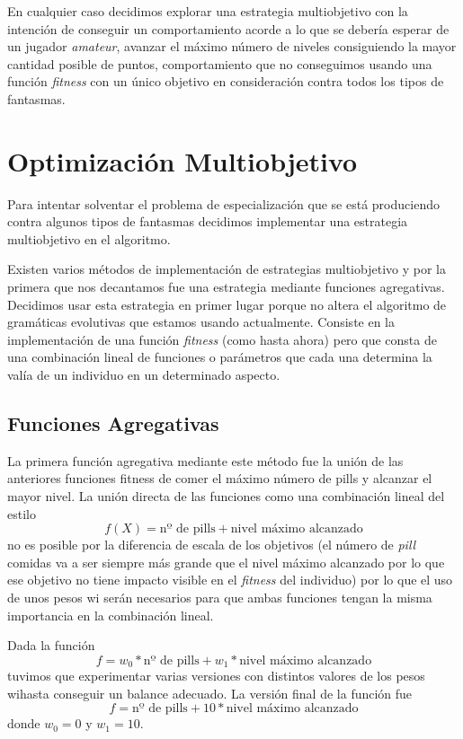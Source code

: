 En cualquier caso decidimos explorar una estrategia multiobjetivo con la intención de conseguir un comportamiento acorde a lo que se debería esperar de un jugador \textit{amateur}, avanzar el máximo número de niveles consiguiendo la mayor cantidad posible de puntos, comportamiento que no conseguimos usando una función \textit{fitness} con un único objetivo en consideración contra todos los tipos de fantasmas.

\section{Optimización Multiobjetivo}
Para intentar solventar el problema de especialización que se está produciendo contra algunos tipos de fantasmas decidimos implementar una estrategia multiobjetivo en el algoritmo.

Existen varios métodos de implementación de estrategias multiobjetivo y por la primera que nos decantamos fue una estrategia mediante funciones agregativas. Decidimos usar esta estrategia en primer lugar porque no altera el algoritmo de gramáticas evolutivas que estamos usando actualmente. Consiste en la implementación de una función \textit{fitness} (como hasta ahora) pero que consta de una combinación lineal de funciones o parámetros que cada una determina la valía de un individuo en un determinado aspecto.

\subsection{Funciones Agregativas}
La primera función agregativa mediante este método fue la unión de las anteriores funciones fitness de comer el máximo número de pills y alcanzar el mayor nivel. La unión directa de las funciones como una combinación lineal del estilo
\begin{equation}
f(X) = \textrm{nº de pills} + \textrm{nivel máximo alcanzado}
\end{equation}
no es posible por la diferencia de escala de los objetivos (el número de \textit{pill} comidas va a ser siempre más grande que el nivel máximo alcanzado por lo que ese objetivo no tiene impacto visible en el \textit{fitness} del individuo) por lo que el uso de unos pesos wi serán necesarios para que ambas funciones tengan la misma importancia en la combinación lineal.

Dada la función
\begin{equation}
f = w_0 * \textrm{nº de pills} + w_1 * \textrm{nivel máximo alcanzado}
\end{equation}
tuvimos que experimentar varias versiones con distintos valores de los pesos wihasta conseguir un balance adecuado. La versión final de la función fue
\begin{equation}
f = \textrm{nº de pills} + 10 * \textrm{nivel máximo alcanzado}
\end{equation}
donde $w_0 = 0$ y $w_1 = 10$.

